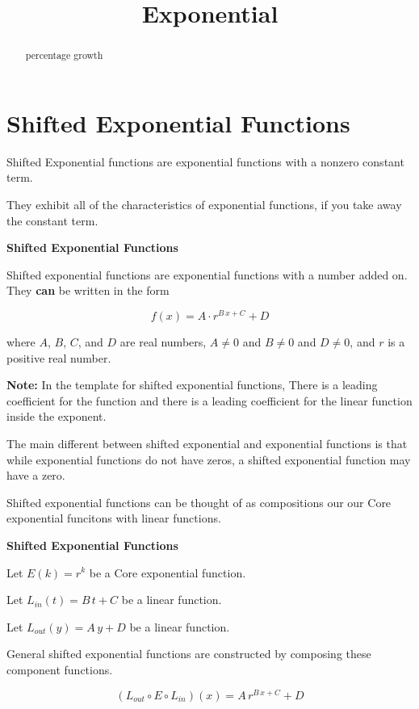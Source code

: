 \documentclass{ximera}
\title{Exponential}
\begin{document}
\begin{abstract}
percentage growth
\end{abstract}
\maketitle





\section*{Shifted Exponential Functions}


Shifted Exponential functions are exponential functions with a nonzero constant term.

They exhibit all of the characteristics of exponential functions, if you take away the constant term.


\begin{definition} \textbf{\textcolor{green!50!black}{Shifted Exponential Functions}}

Shifted exponential functions are exponential functions with a number added on.  They \textbf{\textcolor{purple!85!blue}{can}} be written in the form


\[      f(x) = A \cdot r^{B \, x + C} + D   \]

where $A$, $B$, $C$, and $D$ are real numbers, $A \ne 0$ and $B \ne 0$ and $D \ne 0$, and $r$ is a positive real number.


\end{definition}

\textbf{Note:}  In the template for shifted exponential functions, There is a leading coefficient for the function and there is a leading coefficient for the linear function inside the exponent. 


The main different between shifted exponential and exponential functions is that while exponential functions do not have zeros, a shifted exponential function may have a zero. 







Shifted exponential functions can be thought of as compositions our our Core exponential funcitons with linear functions.



\begin{idea} \textbf{\textcolor{blue!55!black}{Shifted Exponential Functions}}


Let $E(k) = r^k $ be a Core exponential function.

Let $L_{in}(t) = B \, t + C$ be a linear function.

Let $L_{out}(y) = A \, y + D$ be a linear function.


General shifted exponential functions are constructed by composing these component functions.


\[
(L_{out} \circ E \circ L_{in})(x) = A \, r^{B \,x + C} + D
\]




\end{idea}
\end{document}
